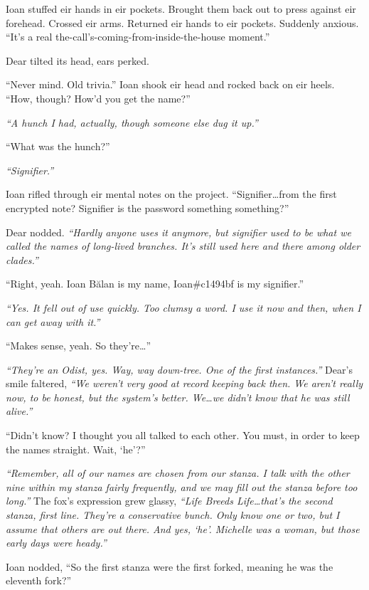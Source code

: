 Ioan stuffed eir hands in eir pockets. Brought them back out to press against eir forehead. Crossed eir arms. Returned eir hands to eir pockets. Suddenly anxious. ``It's a real the-call's-coming-from-inside-the-house moment.''

Dear tilted its head, ears perked.

``Never mind. Old trivia.'' Ioan shook eir head and rocked back on eir heels. ``How, though? How'd you get the name?''

\emph{``A hunch I had, actually, though someone else dug it up.''}

``What was the hunch?''

\emph{``Signifier.''}

Ioan rifled through eir mental notes on the project. ``Signifier\ldots{}from the first encrypted note? Signifier is the password something something?''

Dear nodded. \emph{``Hardly anyone uses it anymore, but signifier used to be what we called the names of long-lived branches. It's still used here and there among older clades.''}

``Right, yeah. Ioan Bălan is my name, Ioan\#c1494bf is my signifier.''

\emph{``Yes. It fell out of use quickly. Too clumsy a word. I use it now and then, when I can get away with it.''}

``Makes sense, yeah. So they're\ldots{}''

\emph{``They're an Odist, yes. Way, way down-tree. One of the first instances.''} Dear's smile faltered, \emph{``We weren't very good at record keeping back then. We aren't really now, to be honest, but the system's better. We\ldots{}we didn't know that he was still alive.''}

``Didn't know? I thought you all talked to each other. You must, in order to keep the names straight. Wait, `he'?''

\emph{``Remember, all of our names are chosen from our stanza. I talk with the other nine within my stanza fairly frequently, and we may fill out the stanza before too long.''} The fox's expression grew glassy, \emph{``Life Breeds Life\ldots{}that's the second stanza, first line. They're a conservative bunch. Only know one or two, but I assume that others are out there. And yes, `he'. Michelle was a woman, but those early days were heady.''}

Ioan nodded, ``So the first stanza were the first forked, meaning he was the eleventh fork?''


